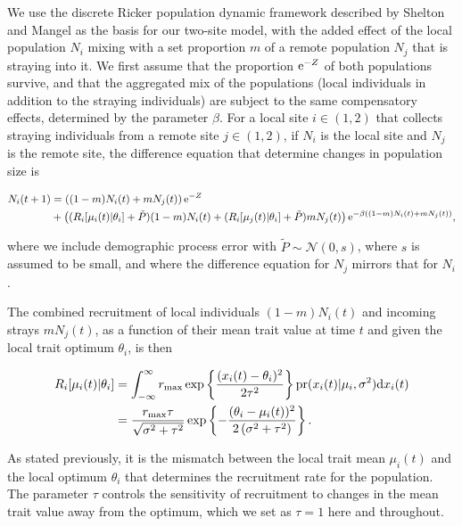 \documentclass[onecolumn,preprintnumbers,amsmath,amssymb,superscriptaddress]{revtex4}
\begin{document}
We use the discrete Ricker population dynamic framework described by Shelton and Mangel \cite{} as the basis for our two-site model, with the added effect of the local population $N_i$ mixing with a set proportion $m$ of a remote population $N_j$ that is straying into it.
We first assume that the proportion ${\rm e}^{-Z}$ of both populations survive, and that the aggregated mix of the populations (local individuals in addition to the straying individuals) are subject to the same compensatory effects, determined by the parameter $\beta$.
For a local site $i\in(1,2)$ that collects straying individuals from a remote site $j\in(1,2)$, if $N_i$ is the local site and $N_j$ is the remote site, the difference equation that determine changes in population size is

\begin{align}
  N_i(t+1) &= \left((1-m)N_i(t) + m N_j(t) \right){\rm e}^{-Z} \\ \nonumber
  &+ \left((R_i[\mu_i(t)|\theta_i]+\tilde{P}) (1-m)N_i(t) + (R_i[\mu_j(t)|\theta_i]+\tilde{P}) m N_j(t)\right) {\rm e}^{-\beta ((1-m)N_i(t) + m N_j(t))},
  \label{eq:N}
\end{align}

\noindent where we include demographic process error with $\tilde{P}\sim \mathcal{N}(0,s)$, where $s$ is assumed to be small, and where the difference equation for $N_j$ mirrors that for $N_i$.

The combined recruitment of local individuals $(1-m)N_i(t)$ and incoming strays $mN_j(t)$, as a function of their mean trait value at time $t$ and given the local trait optimum $\theta_i$, is then

\begin{align}
  R_i[\mu_i(t)|\theta_i] &= \int_{-\infty}^\infty r_{\rm max}\exp\left\{\frac{(x_i(t)-\theta_i)^2}{2\tau^2}\right\} {\rm pr}(x_i(t)|\mu_i,\sigma^2) {\rm d}x_i(t) \\ \nonumber
  &= \frac{r_{\rm max} \tau  }{\sqrt{\sigma ^2+\tau ^2}}\exp\left\{-\frac{(\theta_i-\mu_i(t))^2}{2 \left(\sigma ^2+\tau ^2\right)}\right\}.
  \label{eq:R}
\end{align}

\noindent As stated previously, it is the mismatch between the local trait mean $\mu_i(t)$ and the local optimum $\theta_i$ that determines the recruitment rate for the population.
The parameter $\tau$ controls the sensitivity of recruitment to changes in the mean trait value away from the optimum, which we set as $\tau=1$ here and throughout.
\end{document}
